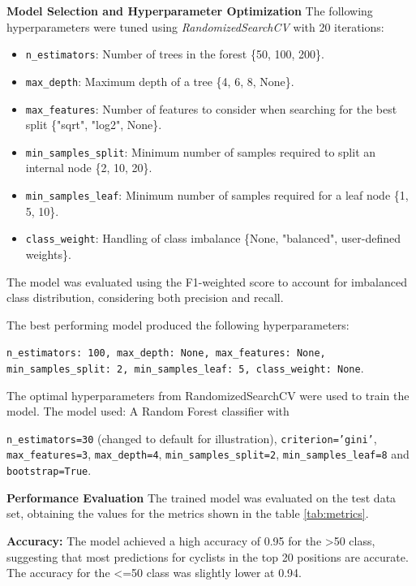 \documentclass[a4paper, twoside]{article}
\begin{document}
\textbf{Model Selection and Hyperparameter Optimization}
The following hyperparameters were tuned using \textit{RandomizedSearchCV} with 20 iterations:
\begin{itemize}[noitemsep]
    \item \texttt{n\_estimators}: Number of trees in the forest \{50, 100, 200\}.
    \item \texttt{max\_depth}: Maximum depth of a tree \{4, 6, 8, None\}.
    \item \texttt{max\_features}: Number of features to consider when searching for the best split \{"sqrt", "log2", None\}.
    \item \texttt{min\_samples\_split}: Minimum number of samples required to split an internal node \{2, 10, 20\}.
    \item \texttt{min\_samples\_leaf}: Minimum number of samples required for a leaf node \{1, 5, 10\}.
    \item \texttt{class\_weight}: Handling of class imbalance \{None, "balanced", user-defined weights\}.
\end{itemize}

The model was evaluated using the F1-weighted score to account for imbalanced class distribution, considering both precision and recall.

The best performing model produced the following hyperparameters:
\begin{center}
\texttt{n\_estimators: 100, max\_depth: None, max\_features: None, min\_samples\_split: 2, min\_samples\_leaf: 5, class\_weight: None}.
\end{center}

The optimal hyperparameters from RandomizedSearchCV were used to train the model. The model used: A Random Forest classifier with 
\begin{center}
\texttt{n\_estimators=30} (changed to default for illustration), \texttt{criterion='gini'}, \texttt{max\_features=3}, \texttt{max\_depth=4}, \texttt{min\_samples\_split=2}, \texttt{min\_samples\_leaf=8} and \texttt{bootstrap=True}.
\end{center}

\textbf{Performance Evaluation}
The trained model was evaluated on the test data set, obtaining the values for the metrics shown in the table \ref{tab:metrics}.

\textbf{Accuracy:} The model achieved a high accuracy of 0.95 for the >50 class, suggesting that most predictions for cyclists in the top 20 positions are accurate. The accuracy for the <=50 class was slightly lower at 0.94. \\
\end{document}

